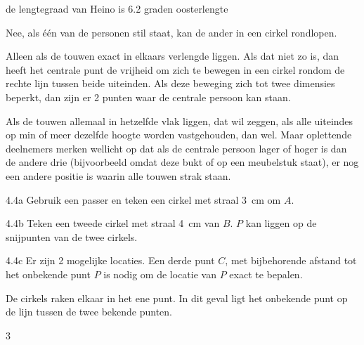 \begin{Antwoord}{3.18}
 de lengtegraad van Heino is 6.2 graden oosterlengte
\end{Antwoord}
\begin{Antwoord}{4.1}
		Nee, als \'e\'en van de personen stil staat, kan de ander in een cirkel rondlopen.
	
\end{Antwoord}
\begin{Antwoord}{4.2}
		Alleen als de touwen exact in elkaars verlengde liggen. Als dat niet zo is, dan heeft het centrale punt de vrijheid om zich te bewegen in een cirkel rondom de rechte lijn tussen beide uiteinden. Als deze beweging zich tot twee dimensies beperkt, dan zijn er 2 punten waar de centrale persoon kan staan.
	
\end{Antwoord}
\begin{Antwoord}{4.3}
		Als de touwen allemaal in hetzelfde vlak liggen, dat wil zeggen, als alle uiteindes op min of meer dezelfde hoogte worden 	vastgehouden, dan wel. Maar oplettende deelnemers merken wellicht op dat als de centrale persoon lager of hoger is dan de 			andere drie (bijvoorbeeld omdat deze bukt of op een meubelstuk staat), er nog een andere positie is waarin alle touwen 				strak staan.
	
\end{Antwoord}
\begin{Antwoord}{4.4a}
			Gebruik een passer en teken een cirkel met straal 3~cm om $A$.
		
\end{Antwoord}
\begin{Antwoord}{4.4b}
			Teken een tweede cirkel met straal 4~cm van $B$. $P$ kan liggen op de snijpunten van de twee cirkels.
		
\end{Antwoord}
\begin{Antwoord}{4.4c}
			Er zijn 2 mogelijke locaties. Een derde punt $C$, met bijbehorende afstand tot het onbekende punt $P$ is nodig om de locatie van $P$ exact te bepalen.
		
\end{Antwoord}
\begin{Antwoord}{4.5}
		De cirkels raken elkaar in het ene punt. In dit geval ligt het onbekende punt op de lijn tussen de twee bekende punten.
	
\end{Antwoord}
\begin{Antwoord}{4.6}
		3
	
\end{Antwoord}
